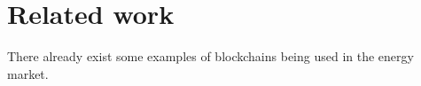\section{Related work}
There already exist some examples of blockchains being used in the energy market.  



